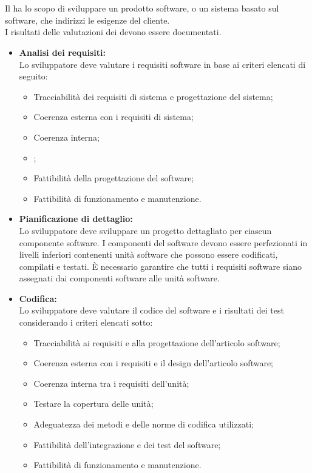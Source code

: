 \mbox{}\\ \\
Il  ha lo scopo di sviluppare un prodotto software, o un sistema basato sul software, che indirizzi le esigenze del cliente. \\
I risultati delle valutazioni dei  devono essere documentati.
\begin{itemize}
    \item \textbf{Analisi dei requisiti:} \\
    Lo sviluppatore deve valutare i requisiti software in base ai criteri elencati di seguito:
        \begin{itemize}
            \item Tracciabilità dei requisiti di sistema e progettazione del sistema;
            \item Coerenza esterna con i requisiti di sistema;
            \item Coerenza interna;
            \item {};
            \item Fattibilità della progettazione del software;
            \item Fattibilità di funzionamento e manutenzione.
        \end{itemize}
    \item \textbf{Pianificazione di dettaglio:} \\
    Lo sviluppatore deve sviluppare un progetto dettagliato per ciascun componente software. I componenti del software 
    devono essere perfezionati in livelli inferiori contenenti unità software che possono essere codificati, compilati 
    e testati. È necessario garantire che tutti i requisiti software siano assegnati dai componenti software 
    alle unità software.
    
    \item \textbf{Codifica:} \\
    Lo sviluppatore deve valutare il codice del software e i risultati dei test considerando i criteri elencati sotto:
    \begin{itemize}
        \item Tracciabilità ai requisiti e alla progettazione dell'articolo software;
        \item Coerenza esterna con i requisiti e il design dell'articolo software;
        \item Coerenza interna tra i requisiti dell'unità;
        \item Testare la copertura delle unità;
        \item Adeguatezza dei metodi e delle norme di codifica utilizzati;
        \item Fattibilità dell'integrazione e dei test del software;
        \item Fattibilità di funzionamento e manutenzione.   
    \end{itemize}
\end{itemize}

